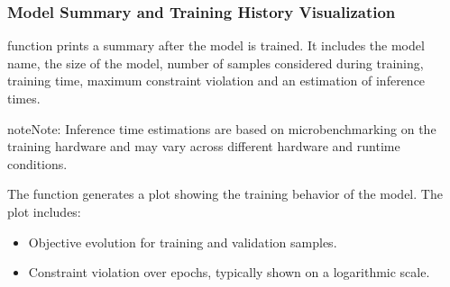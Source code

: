 \documentclass[letterpaper,10pt,english,openany,oneside]{sphinxmanual}
\begin{document}
\begin{sphinxVerbatim}[commandchars=\\\{\}]

  
  \PYG{p}{[}\PYG{p}{]}

 
\end{sphinxVerbatim}


\subsubsection{Model Summary and Training History Visualization}
\label{\detokenize{user-guide/training-and-inference:model-summary-and-training-history-visualization}}
\sphinxAtStartPar
{} function prints a summary after the model is trained. It includes the model name, the size of the model, number of samples considered during training, training time, maximum constraint violation and an estimation of inference times.

\begin{sphinxVerbatim}[commandchars=\\\{\}]
\end{sphinxVerbatim}

\begin{sphinxadmonition}{note}{Note:}
\sphinxAtStartPar
Inference time estimations are based on microbenchmarking on the training hardware and may vary across different hardware and runtime conditions.
\end{sphinxadmonition}

\sphinxAtStartPar
The  function generates a plot showing the training behavior of the model. The plot includes:
\begin{itemize}
\item {} 
\sphinxAtStartPar
Objective evolution for training and validation samples.

\item {} 
\sphinxAtStartPar
Constraint violation over epochs, typically shown on a logarithmic scale.

\end{itemize}
\end{document}

